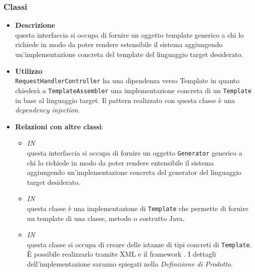 \subsubsection{Classi}
\label{\nogloxy{swedesigner::server::template::Template}}
\begin{itemize}
\item \textbf{Descrizione}\\
questa interfaccia si occupa di fornire un oggetto template generico a chi lo richiede in modo da poter rendere estensibile il sistema aggiungendo un'implementazione concreta del template del linguaggio target desiderato.
\item \textbf{Utilizzo}\\
\texttt{RequestHandlerController} ha una dipendenza verso Template in quanto chiederà a \texttt{TemplateAssembler} una implementazione concreta di un \texttt{Template} in base al linguaggio target. Il pattern realizzato con questa classe è una \emph{dependency injection}.
\item \textbf{Relazioni con altre classi}:
\begin{itemize}
\item \textit{IN} \hyperref[\nogloxy{swedesigner::server::generator::Generator}]{}\\
questa interfaccia si occupa di fornire un oggetto \texttt{Generator} generico a chi lo richiede in modo da poter rendere entensibile il sistema aggiungendo un'implementazione concreta del generator del linguaggio target desiderato.
\item \textit{IN} \hyperref[\nogloxy{swedesigner::server::template::java::JavaTemplate}]{}\\
questa classe è una implementazione di \texttt{Template} che permette di fornire un template di una classe, metodo o costrutto Java.
\item \textit{IN} \hyperref[\nogloxy{swedesigner::server::template::TemplateAssembler}]{}\\
questa classe si occupa di creare delle istanze di tipi concreti di \texttt{Template}. È possibile realizzarlo tramite XML e il framework \spring. I dettagli dell'implementazione saranno spiegati nella \emph{Definizione di Prodotto}. %
\end{itemize}
\end{itemize}

